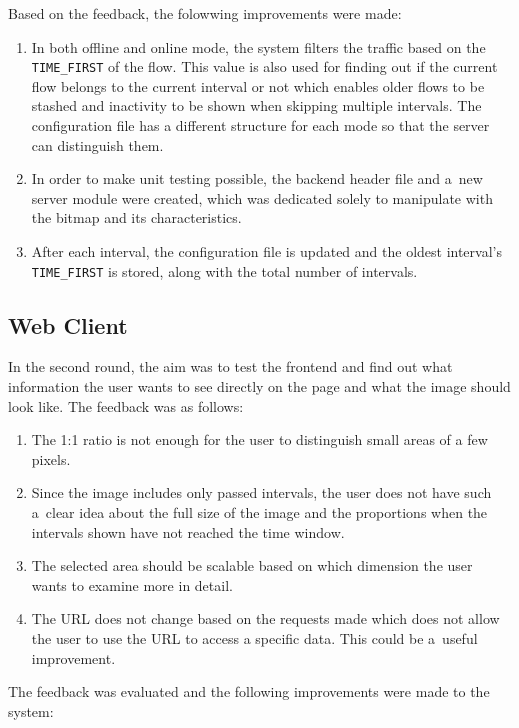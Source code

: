 Based on the feedback, the folowwing improvements were made:

\begin{enumerate}
   \item In both offline and online mode, the system filters the traffic
   based on the \texttt{TIME\_FIRST} of the flow. This value is also used
   for finding out if the current flow belongs to the current interval or not which
   enables older flows to be stashed and inactivity to be shown when skipping multiple
   intervals. The configuration file has a different structure for each mode
   so that the server can distinguish them.
   \item In order to make unit testing possible, the backend header file
   and a~new server module were created, which was dedicated solely
   to manipulate with the bitmap and its characteristics.
   \item After each interval, the configuration file is updated and the
   oldest interval's \texttt{TIME\_\-FIRST} is stored, along with the total
   number of intervals.
\end{enumerate}

\subsection{Web Client}
In the second round, the aim was to test the frontend and find out what
information the user wants to see directly on the page and what the image
should look like. The feedback was as follows:

\begin{enumerate}
   \item The 1:1 ratio is not enough for the user to distinguish small
   areas of a few pixels.
   \item Since the image includes only passed intervals, the user does
   not have such a~clear idea about the full size of the image and the
   proportions when the intervals shown have not reached the time window.
   \item The selected area should be scalable based on which dimension
   the user wants to examine more in detail.
   \item The URL does not change based on the requests made which does not
   allow the user to use the URL to access a specific data. This could be
   a~useful improvement.
   
\end{enumerate}

The feedback was evaluated and the following improvements were made to the system:

